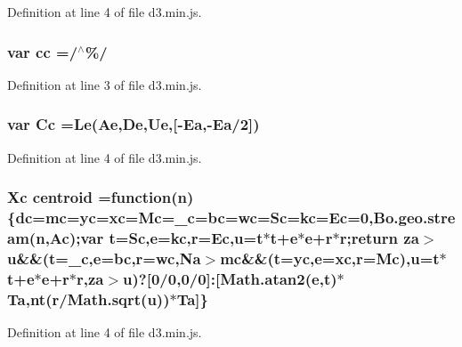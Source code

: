 Definition at line 4 of file d3.\+min.\+js.

\subsubsection[{cc}]{\setlength{\rightskip}{0pt plus 5cm}var cc =/$^\wedge$\%/}\label{d3_8min_8js_ac24510c2f35b44d7765bf4b56483a630}


Definition at line 3 of file d3.\+min.\+js.

\subsubsection[{Cc}]{\setlength{\rightskip}{0pt plus 5cm}var Cc =Le(Ae,De,Ue,[-\/{\bf Ea},-\/{\bf Ea}/2])}\label{d3_8min_8js_a691e030ea180e2f147175ee6f008e70c}


Definition at line 4 of file d3.\+min.\+js.

\subsubsection[{centroid}]{ {\bf Xc} centroid =function({\bf n})\{{\bf dc}={\bf mc}={\bf yc}={\bf xc}={\bf Mc}={\bf \+\_\+c}={\bf bc}={\bf wc}={\bf Sc}={\bf kc}={\bf Ec}=0,{\bf Bo.\+geo.\+stream}({\bf n},{\bf Ac});var t={\bf Sc},{\bf e}={\bf kc},{\bf r}={\bf Ec},u=t$\ast$t+{\bf e}$\ast${\bf e}+{\bf r}$\ast${\bf r};{\bf return} {\bf za}$>$u\&\&(t={\bf \+\_\+c},{\bf e}={\bf bc},{\bf r}={\bf wc},{\bf Na}$>${\bf mc}\&\&(t={\bf yc},{\bf e}={\bf xc},{\bf r}={\bf Mc}),u=t$\ast$t+{\bf e}$\ast${\bf e}+{\bf r}$\ast${\bf r},{\bf za}$>$u)?[0/0,0/0]\+:[Math.\+atan2({\bf e},t)$\ast${\bf Ta},nt({\bf r}/{\bf Math.\+sqrt}(u))$\ast${\bf Ta}]\}}\label{d3_8min_8js_a7ed50781d9c90e2003260b5f42986018}


Definition at line 4 of file d3.\+min.\+js.

